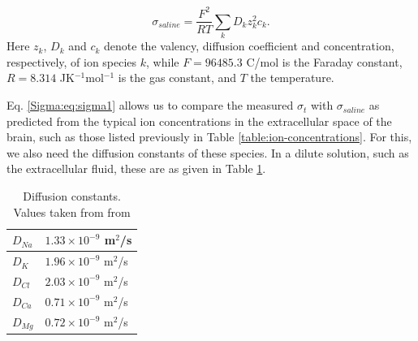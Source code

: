 \begin{equation}
\sigma_{saline} = \frac{F^2}{RT}\sum_{k} D_k z_{k}^2 c_{k}.
\label{Sigma:eq:sigma1}
\end{equation}
Here $z_{k}$, $D_k$ and $c_{k}$ denote the valency, diffusion coefficient and concentration, respectively, of ion species $k$, while $F = 96485.3$ C/mol is the Faraday constant, $R = 8.314$ JK$^{-1}$mol$^{-1}$ is the gas constant, and $T$ the temperature. 

Eq. \ref{Sigma:eq:sigma1} allows us to compare the measured $\sigma_t$ with $\sigma_{saline}$ as predicted from the typical ion concentrations in the extracellular space of the brain, such as those listed previously in Table \ref{table:ion-concentrations}. For this, we also need the diffusion constants of these species. In a dilute solution, such as the extracellular fluid, these are as given in Table \ref{Sigma:tab:diffconsts}.

\begin{table}[h!]
\begin{center}
\caption{Diffusion constants. Values taken from from \citep{Bowen2002, Lyshevski2007}}
\label{Sigma:tab:diffconsts}
    \begin{tabular}{l|l}
    \hline
    $D_{Na}$ & $1.33\times 10^{-9}$ m$^2$/s\\ \hline
    $D_K$ & $1.96  \times 10^{-9}$ m$^2$/s \\ \hline
    $D_{Cl}$ & $2.03 \times 10^{-9}$ m$^2$/s \\ \hline
    $D_{Ca}$ & $0.71\times 10^{-9}$ m$^2$/s \\ \hline
    $D_{Mg}$ & $0.72\times 10^{-9}$ m$^2$/s \\ \hline    
    \end{tabular}
\end{center}
\end{table}

